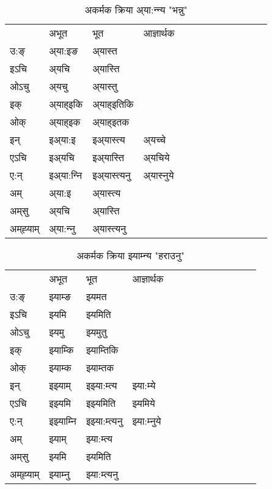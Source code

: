 \begin{table}[H]
\centering
\caption{\label{ɛt.vi} अकर्मक क्रिया  अ्या:न्‍न्य  "भन्नु"  }
\begin{tabular}{l|l|l|l|l|l|l|l|l|l|l|l|l}  \toprule
&अभूत & भूत & आज्ञार्थक \\ 
उ:ङ्‌ &अ्या:इङ &अ्यास्त \\ 
इऽचि &अ्यचि &अ्यास्ति   \\ 
ओऽचु &अ्यचु &अ्यास्तु   \\ 
इक् &अ्याह्इकि &अ्याह्इतिकि   \\ 
ओक् &अ्याह्इक &अ्याह्इतक   \\ 
इन् & इअ्या:इ & इअ्यास्त्य &अ्यच्‍चे  \\ 
एऽचि & इअ्यचि & इअ्यास्ति &अ्यचिये    \\ 
ए:न् & इअ्या:न्‍नि  & इअ्यास्त्यनु &अ्यास्‍नुये  \\ 
अम् & अ्या:इ & अ्यास्त्य   \\ 
अम्‌सु & अ्यचि & अ्यास्ति   \\ 
अम्‌ह्‍याम् & अ्या:न्‍नु  & अ्यास्त्यनु \\ 
\bottomrule
\end{tabular}
\end{table}


\begin{table}[H]
\centering
\caption{\label{ɛm.vi} अकर्मक क्रिया  झ्याम्‍न्य  "हराउनु"  }
\begin{tabular}{l|l|l|l|l|l|l|l|l|l|l|l|l}  \toprule
&अभूत & भूत & आज्ञार्थक \\ 
उ:ङ्‌ &झ्याम्ङ &झ्यमत \\ 
इऽचि &झ्यमि &झ्यमिति   \\ 
ओऽचु &झ्यमु &झ्यमुतु   \\ 
इक् &झ्याम्कि &झ्याम्तिकि   \\ 
ओक् &झ्याम्क &झ्याम्तक   \\ 
इन् & इझ्याम् & इझ्या:म्त्य &झ्या:म्ये  \\ 
एऽचि & इझ्यमि & इझ्यमिति &झ्यमिये    \\ 
ए:न् & इझ्याम्‍नि  & इझ्या:म्त्यनु &झ्या:म्‍नुये  \\ 
अम् & झ्याम् & झ्या:म्त्य   \\ 
अम्‌सु & झ्यमि & झ्यमिति   \\ 
अम्‌ह्‍याम् & झ्याम्‍नु  & झ्या:म्त्यनु \\ 
\bottomrule
\end{tabular}
\end{table}


